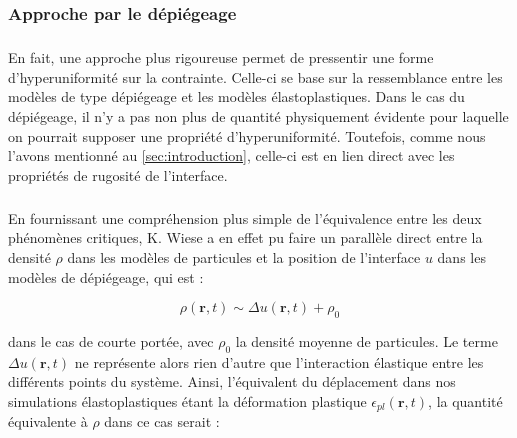 %
%
%
%

\subsubsection{Approche par le dépiégeage}

\subparagraph{}En fait, une approche plus rigoureuse permet de pressentir une forme d'hyperuniformité sur la contrainte. Celle-ci se base sur la ressemblance entre les modèles de type dépiégeage et les modèles élastoplastiques. Dans le cas du dépiégeage, il n'y a pas non plus de quantité physiquement évidente pour laquelle on pourrait supposer une propriété d'hyperuniformité. Toutefois, comme nous l'avons mentionné au \autoref{sec:introduction}, celle-ci est en lien direct avec les propriétés de rugosité de l'interface.

\subparagraph{}En fournissant une compréhension plus simple de l'équivalence entre les deux phénomènes critiques, K. Wiese \cite{wiese_hyperuniformity_2024} a en effet pu faire un parallèle direct entre la densité $\rho$ dans les modèles de particules et la position de l'interface $u$ dans les modèles de dépiégeage, qui est :

\begin{equation}
	\rho(\mathbf{r},t) \sim \Delta u(\mathbf{r},t) + \rho_0
\end{equation}

\noindent dans le cas de courte portée, avec $\rho_0$ la densité moyenne de particules. Le terme $\Delta u(\mathbf{r},t)$ ne représente alors rien d'autre que l'interaction élastique entre les différents points du système. Ainsi, l'équivalent du déplacement dans nos simulations élastoplastiques étant la déformation plastique $
\epsilon_{pl}(\mathbf{r},t)$, la quantité équivalente à $\rho$ dans ce cas serait :

